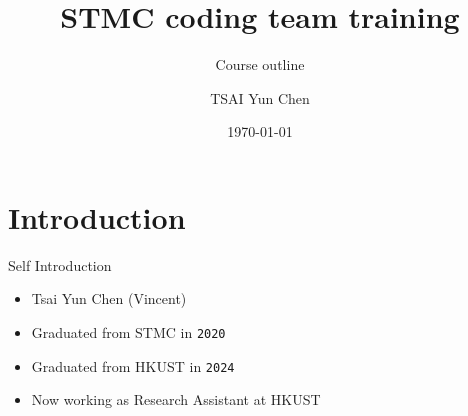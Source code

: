 \documentclass[10pt,xcolor={table,dvipsnames},t]{beamer}
\title[Your Short Title]{STMC coding team training}
\subtitle{Course outline}
\author{TSAI Yun Chen}
\date{\today}
\begin{document}
\begin{frame}
  \titlepage
\end{frame}


\section{Introduction}

\begin{frame}{Self Introduction}

\begin{itemize}
  \item Tsai Yun Chen (Vincent)
  \item Graduated from STMC in \texttt{2020}
  \item Graduated from HKUST in \texttt{2024}
  \item Now working as Research Assistant at HKUST
\end{itemize}

\end{frame}
\end{document}
